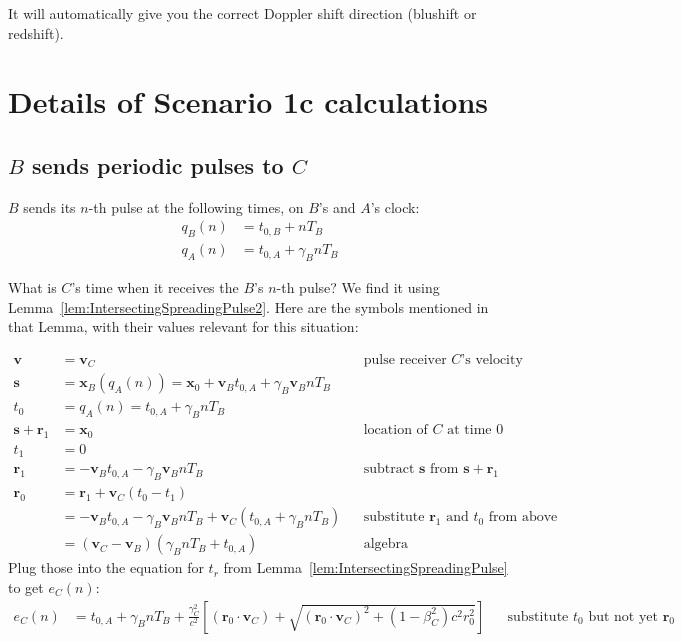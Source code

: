 \documentclass[a4paper]{article}
\theoremstyle{plain}
\theoremstyle{definition}
\newcommand{\vect}[1]{\mathbf{#1}}
\begin{document}
It will automatically give you the correct Doppler shift direction
(blushift or redshift).


\section{Details of Scenario 1c calculations}
\label{app:scen1c}


\subsection{$B$ sends periodic pulses to $C$}
\label{app:scen1c-Bsending}

$B$ sends its $n$-th pulse at the following times, on $B$'s and $A$'s
clock:
\begin{align}
q_B(n) & = t_{0,B} + nT_B \\
q_A(n) & = t_{0,A} + \gamma_B nT_B
\end{align}

What is $C$'s time when it receives the $B$'s $n$-th pulse?  We find
it using Lemma~\ref{lem:IntersectingSpreadingPulse2}.  Here are the
symbols mentioned in that Lemma, with their values relevant for this
situation:

\begin{align*}
\vect{v} & = \vect{v}_C & & \text{pulse receiver $C$'s velocity} \\
\vect{s} & = \vect{x}_B(q_A(n)) = \vect{x}_0 + \vect{v}_B t_{0,A} + \gamma_B \vect{v}_B n T_B  & & \text{} \\
t_0 & = q_A(n) = t_{0,A} + \gamma_B nT_B & & \text{} \\
\vect{s} + \vect{r}_1 & = \vect{x}_0 & & \text{location of $C$ at time 0} \\
t_1 & = 0 \\
\vect{r}_1 & = - \vect{v}_B t_{0,A} - \gamma_B \vect{v}_B n T_B & & \text{subtract $\vect{s}$ from $\vect{s}+\vect{r}_1$} \\
\vect{r}_0
  & = \vect{r}_1 + \vect{v}_C(t_0-t_1) \\
  & = - \vect{v}_B t_{0,A} - \gamma_B \vect{v}_B n T_B + \vect{v}_C (t_{0,A} + \gamma_B nT_B) & & \text{substitute $\vect{r}_1$ and $t_0$ from above} \\
  & = (\vect{v}_C - \vect{v}_B) (\gamma_B n T_B + t_{0,A}) & & \text{algebra}
\end{align*}
Plug those into the equation for $t_r$ from
Lemma~\ref{lem:IntersectingSpreadingPulse} to get $e_{C}(n)$:
\begin{align*}
e_{C}(n) & = t_{0,A} + \gamma_B nT_B + \frac{\gamma_C^2}{c^2} \left[ (\vect{r}_0 \cdot \vect{v}_C) + \sqrt{(\vect{r}_0 \cdot \vect{v}_C)^2 + (1-\beta_C^2)c^2 r_0^2} \right] & & \text{substitute $t_0$ but not yet $\vect{r}_0$}
\end{align*}
\end{document}
